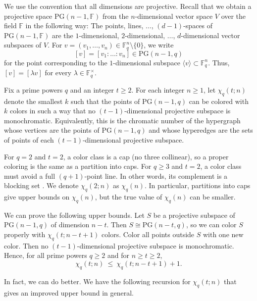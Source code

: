 \documentclass[11pt]{article}
\theoremstyle{plain}
\newcommand{\F}{\mathbb{F}}
\newcommand{\PG}{\mathrm{PG}}
\begin{document}
We use the convention that all dimensions are projective.
Recall that we obtain a projective space $\PG(n-1,\F)$ from the $n$-dimensional vector space $V$ over the field $\F$ in the following way:
The points, lines, $\ldots$, $(d-1)$-spaces of $\PG(n - 1, \mathbb{F})$ are the $1$-dimensional, $2$-dimensional, $\dots$, $d$-dimensional vector subspaces of $V$.
For $v = (v_1,\dots,v_n) \in \F_q^n \setminus \{0\}$, we write
\[
  [v] = [v_1 : \dots : v_n] \in \PG(n-1,q)
\]
for the point corresponding to the $1$-dimensional subspace $\langle v \rangle \subset \F_q^n$.
Thus, $[v] = [\lambda v]$ for every $\lambda \in \F_q^\times$.

Fix a prime powers $q$ and an integer $t\ge 2$.
For each integer $n\ge 1$, let $\chi_q(t;n)$ denote the smallest $k$ such that the points of $\PG(n-1,q)$ can be colored with $k$ colors in such a way that no $(t-1)$-dimensional projective subspace is monochromatic.
Equivalently, this is the chromatic number of the hypergraph whose vertices are the points of $\PG(n-1,q)$ and whose hyperedges are the sets of points of each $(t-1)$-dimensional projective subspace.

For $q=2$ and $t=2$, a color class is a cap (no three collinear), so a proper coloring is the same as a partition into caps. 
For $q\ge 3$ and $t=2$, a color class must avoid a full $(q+1)$-point line.
In other words, its complement is a blocking set \cite{Beutelspacher1980}. 
We denote $\chi_q(2;n)$ as $\chi_q(n)$.
In particular, partitions into caps give upper bounds on $\chi_q(n)$, but the true value of $\chi_q(n)$ can be smaller.

We can prove the following upper bounds.
Let $S$ be a projective subspace of $\PG(n-1,q)$ of dimension $n-t$.
Then $S\cong\PG(n-t,q)$, so we can color $S$ properly
with $\chi_q(t;n-t+1)$ colors.
Color all points outside $S$ with one new color. Then no $(t-1)$-dimensional projective subspace is monochromatic.
Hence, for all prime powers $q\ge 2$ and for $n \ge t\ge 2$,
\begin{equation}\label{qtrecursion1}
  \chi_q(t;n)\ \le\ \chi_{q}(t;n-t+1)+1.  
\end{equation}

In fact, we can do better. 
We have the following recursion for $\chi_q(t;n)$ that gives an improved upper bound in general. 
\end{document}
